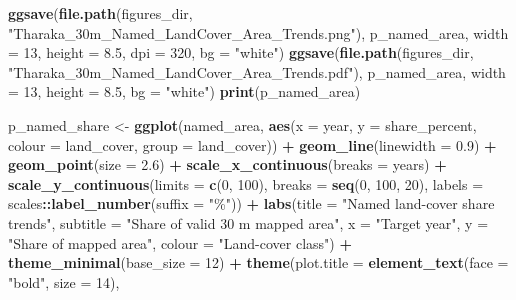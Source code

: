 \documentclass[
]{article}
\newenvironment{Shaded}{\begin{snugshade}}{\end{snugshade}}
\newcommand{\AttributeTok}[1]{\textcolor[rgb]{0.13,0.29,0.53}{#1}}
\newcommand{\DecValTok}[1]{\textcolor[rgb]{0.00,0.00,0.81}{#1}}
\newcommand{\FloatTok}[1]{\textcolor[rgb]{0.00,0.00,0.81}{#1}}
\newcommand{\FunctionTok}[1]{\textcolor[rgb]{0.13,0.29,0.53}{\textbf{#1}}}
\newcommand{\NormalTok}[1]{#1}
\newcommand{\OtherTok}[1]{\textcolor[rgb]{0.56,0.35,0.01}{#1}}
\newcommand{\SpecialCharTok}[1]{\textcolor[rgb]{0.81,0.36,0.00}{\textbf{#1}}}
\newcommand{\StringTok}[1]{\textcolor[rgb]{0.31,0.60,0.02}{#1}}
\begin{document}
\begin{Shaded}
\begin{Highlighting}[]
  \FunctionTok{ggsave}\NormalTok{(}\FunctionTok{file.path}\NormalTok{(figures\_dir, }\StringTok{"Tharaka\_30m\_Named\_LandCover\_Area\_Trends.png"}\NormalTok{), p\_named\_area, }\AttributeTok{width =} \DecValTok{13}\NormalTok{, }\AttributeTok{height =} \FloatTok{8.5}\NormalTok{, }\AttributeTok{dpi =} \DecValTok{320}\NormalTok{, }\AttributeTok{bg =} \StringTok{"white"}\NormalTok{)}
  \FunctionTok{ggsave}\NormalTok{(}\FunctionTok{file.path}\NormalTok{(figures\_dir, }\StringTok{"Tharaka\_30m\_Named\_LandCover\_Area\_Trends.pdf"}\NormalTok{), p\_named\_area, }\AttributeTok{width =} \DecValTok{13}\NormalTok{, }\AttributeTok{height =} \FloatTok{8.5}\NormalTok{, }\AttributeTok{bg =} \StringTok{"white"}\NormalTok{)}
  \FunctionTok{print}\NormalTok{(p\_named\_area)}

\NormalTok{  p\_named\_share }\OtherTok{\textless{}{-}} \FunctionTok{ggplot}\NormalTok{(named\_area, }\FunctionTok{aes}\NormalTok{(}\AttributeTok{x =}\NormalTok{ year, }\AttributeTok{y =}\NormalTok{ share\_percent, }\AttributeTok{colour =}\NormalTok{ land\_cover, }\AttributeTok{group =}\NormalTok{ land\_cover)) }\SpecialCharTok{+}
    \FunctionTok{geom\_line}\NormalTok{(}\AttributeTok{linewidth =} \FloatTok{0.9}\NormalTok{) }\SpecialCharTok{+} \FunctionTok{geom\_point}\NormalTok{(}\AttributeTok{size =} \FloatTok{2.6}\NormalTok{) }\SpecialCharTok{+} \FunctionTok{scale\_x\_continuous}\NormalTok{(}\AttributeTok{breaks =}\NormalTok{ years) }\SpecialCharTok{+}
    \FunctionTok{scale\_y\_continuous}\NormalTok{(}\AttributeTok{limits =} \FunctionTok{c}\NormalTok{(}\DecValTok{0}\NormalTok{, }\DecValTok{100}\NormalTok{), }\AttributeTok{breaks =} \FunctionTok{seq}\NormalTok{(}\DecValTok{0}\NormalTok{, }\DecValTok{100}\NormalTok{, }\DecValTok{20}\NormalTok{), }\AttributeTok{labels =}\NormalTok{ scales}\SpecialCharTok{::}\FunctionTok{label\_number}\NormalTok{(}\AttributeTok{suffix =} \StringTok{"\%"}\NormalTok{)) }\SpecialCharTok{+}
    \FunctionTok{labs}\NormalTok{(}\AttributeTok{title =} \StringTok{"Named land{-}cover share trends"}\NormalTok{, }\AttributeTok{subtitle =} \StringTok{"Share of valid 30 m mapped area"}\NormalTok{,}
         \AttributeTok{x =} \StringTok{"Target year"}\NormalTok{, }\AttributeTok{y =} \StringTok{"Share of mapped area"}\NormalTok{, }\AttributeTok{colour =} \StringTok{"Land{-}cover class"}\NormalTok{) }\SpecialCharTok{+}
    \FunctionTok{theme\_minimal}\NormalTok{(}\AttributeTok{base\_size =} \DecValTok{12}\NormalTok{) }\SpecialCharTok{+} \FunctionTok{theme}\NormalTok{(}\AttributeTok{plot.title =} \FunctionTok{element\_text}\NormalTok{(}\AttributeTok{face =} \StringTok{"bold"}\NormalTok{, }\AttributeTok{size =} \DecValTok{14}\NormalTok{),}

\end{Highlighting}
\end{Shaded}
\end{document}

